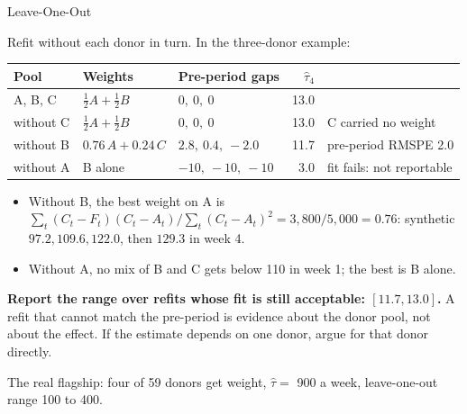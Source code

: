 \documentclass[aspectratio=169, 11pt, handout]{beamer}
\newcommand{\hatt}{\hat{\tau}}
\begin{document}
\begin{frame}{Leave-One-Out}

Refit without each donor in turn. In the three-donor example:

\begin{center}
\small
\begin{tabular}{lllrl}
\toprule
\textbf{Pool} & \textbf{Weights} & \textbf{Pre-period gaps} & $\hatt_4$ & \\
\midrule
A, B, C & $\tfrac12 A + \tfrac12 B$ & $0,\ 0,\ 0$ & 13.0 & \\
without C & $\tfrac12 A + \tfrac12 B$ & $0,\ 0,\ 0$ & 13.0 & C carried no weight \\
without B & $0.76\,A + 0.24\,C$ & $2.8,\ 0.4,\ -2.0$ & 11.7 & pre-period RMSPE 2.0 \\
without A & B alone & $-10,\ -10,\ -10$ & 3.0 & \textcolor{warnred}{fit fails: not reportable} \\
\bottomrule
\end{tabular}
\end{center}

\small
\begin{itemize}
  \item Without B, the best weight on A is $\sum_t (C_t - F_t)(C_t - A_t) / \sum_t (C_t - A_t)^2 = 3{,}800/5{,}000 = 0.76$: synthetic $97.2, 109.6, 122.0$, then $129.3$ in week 4.
  \item Without A, no mix of B and C gets below 110 in week 1; the best is B alone.
\end{itemize}

\normalsize
\textbf{Report the range over refits whose fit is still acceptable: $[11.7, 13.0]$.} A refit that cannot match the pre-period is evidence about the donor pool, not about the effect. If the estimate depends on one donor, argue for that donor directly.

The real flagship: four of 59 donors get weight, $\hatt =$ 900 a week, leave-one-out range 100 to 400.
\end{frame}
\end{document}
